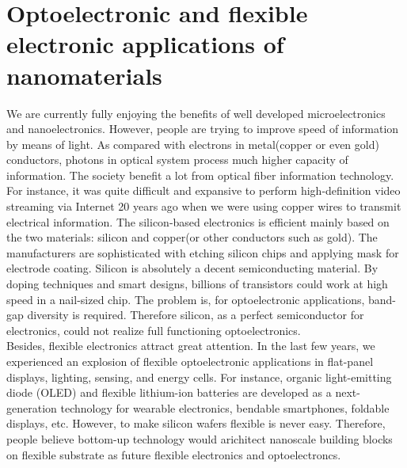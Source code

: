 \section{Optoelectronic and flexible electronic applications of nanomaterials}
We are currently fully enjoying the benefits of well developed microelectronics and nanoelectronics. However, people are trying to improve speed of information by means of light. As compared with electrons in metal(copper or even gold) conductors, photons in optical system process much higher capacity of information. The society benefit a lot from optical fiber information technology. For instance, it was quite difficult and expansive to perform high-definition video streaming via Internet 20 years ago when we were using copper wires to transmit electrical information. 
The silicon-based electronics is efficient mainly based on the two materials: silicon and copper(or other conductors such as gold). The manufacturers are sophisticated with etching silicon chips and applying mask for electrode coating. Silicon is absolutely a decent semiconducting material. By doping techniques and smart designs, billions of transistors could work at high speed in a nail-sized chip. The problem is, for optoelectronic applications, band-gap diversity is required. Therefore silicon, as a perfect semiconductor for electronics, could not realize full functioning optoelectronics. \\ 
Besides, flexible electronics attract great attention. In the last few years, we experienced an explosion of flexible optoelectronic applications in flat-panel displays, lighting, sensing, and energy cells. For instance, organic light-emitting diode (OLED) and flexible lithium-ion batteries are developed as a next-generation technology for wearable electronics, bendable smartphones, foldable displays, etc. However, to make silicon wafers flexible is never easy. Therefore, people believe bottom-up technology would arichitect nanoscale building blocks on flexible substrate as future flexible electronics and optoelectroncs. \\

